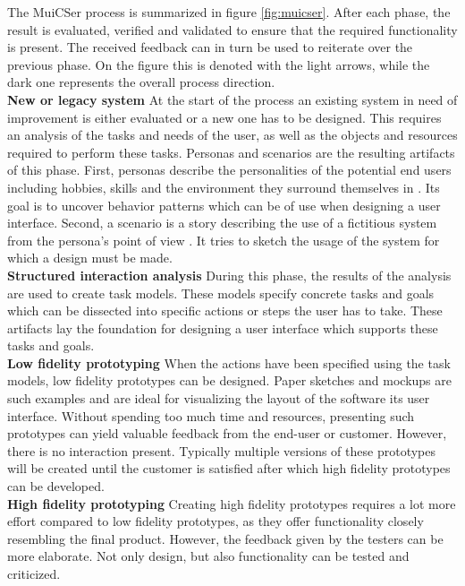         The MuiCSer process is summarized in figure \ref{fig:muicser}. After each phase, the result is evaluated, verified and validated to ensure that the required functionality is present. The received feedback can in turn be used to reiterate over the previous phase. On the figure this is denoted with the light arrows, while the dark one represents the overall process direction.\\

        \noindent\textbf{New or legacy system} At the start of the process an existing system in need of improvement is either evaluated or a new one has to be designed. This requires an analysis of the tasks and needs of the user, as well as the objects and resources required to perform these tasks. Personas and scenarios are the resulting artifacts of this phase. First, personas describe the personalities of the potential end users including hobbies, skills and the environment they surround themselves in \cite{persona_scenario}. Its goal is to uncover behavior patterns which can be of use when designing a user interface. Second, a scenario is a story describing the use of a fictitious system from the persona's point of view \cite{persona_scenario}. It tries to sketch the usage of the system for which a design must be made.\\

        \noindent\textbf{Structured interaction analysis} During this phase, the results of the analysis are used to create task models. These models specify concrete tasks and goals which can be dissected into specific actions or steps the user has to take. These artifacts lay the foundation for designing a user interface which supports these tasks and goals.\\

        \noindent\textbf{Low fidelity prototyping} When the actions have been specified using the task models, low fidelity prototypes can be designed. Paper sketches and mockups are such examples and are ideal for visualizing the layout of the software its user interface. Without spending too much time and resources, presenting such prototypes can yield valuable feedback from the end-user or customer. However, there is no interaction present. Typically multiple versions of these prototypes will be created until the customer is satisfied after which high fidelity prototypes can be developed.\\

        \noindent\textbf{High fidelity prototyping} Creating high fidelity prototypes requires a lot more effort compared to low fidelity prototypes, as they offer functionality closely resembling the final product. However, the feedback given by the testers can be more elaborate. Not only design, but also functionality can be tested and criticized.\\

